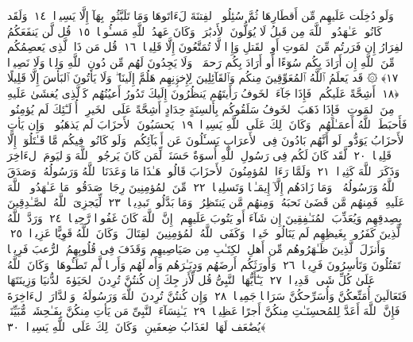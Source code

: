  وَلَو دُخِلَت عَلَيهِم مِّن أَقطَارِهَا ثُمَّ سُئِلُوا۟ ٱلفِتنَةَ لَءَاتَوهَا وَمَا تَلَبَّثُوا۟ بِهَآ إِلَّا يَسِيرًۭا ﴿١٤﴾
 وَلَقَد كَانُوا۟ عَـٰهَدُوا۟ ٱللَّهَ مِن قَبلُ لَا يُوَلُّونَ ٱلأَدبَٰرَ ۚ وَكَانَ عَهدُ ٱللَّهِ مَسـُٔولًۭا ﴿١٥﴾
 قُل لَّن يَنفَعَكُمُ ٱلفِرَارُ إِن فَرَرتُم مِّنَ ٱلمَوتِ أَوِ ٱلقَتلِ وَإِذًۭا لَّا تُمَتَّعُونَ إِلَّا قَلِيلًۭا ﴿١٦﴾
 قُل مَن ذَا ٱلَّذِى يَعصِمُكُم مِّنَ ٱللَّهِ إِن أَرَادَ بِكُم سُوٓءًا أَو أَرَادَ بِكُم رَحمَةًۭ ۚ وَلَا يَجِدُونَ لَهُم مِّن دُونِ ٱللَّهِ وَلِيًّۭا وَلَا نَصِيرًۭا ﴿١٧﴾
 ۞ قَد يَعلَمُ ٱللَّهُ ٱلمُعَوِّقِينَ مِنكُم وَٱلقَآئِلِينَ لِإِخوَٟنِهِم هَلُمَّ إِلَينَا ۖ وَلَا يَأتُونَ ٱلبَأسَ إِلَّا قَلِيلًا ﴿١٨﴾
 أَشِحَّةً عَلَيكُم ۖ فَإِذَا جَآءَ ٱلخَوفُ رَأَيتَهُم يَنظُرُونَ إِلَيكَ تَدُورُ أَعيُنُهُم كَٱلَّذِى يُغشَىٰ عَلَيهِ مِنَ ٱلمَوتِ ۖ فَإِذَا ذَهَبَ ٱلخَوفُ سَلَقُوكُم بِأَلسِنَةٍ حِدَادٍ أَشِحَّةً عَلَى ٱلخَيرِ ۚ أُو۟لَـٰٓئِكَ لَم يُؤمِنُوا۟ فَأَحبَطَ ٱللَّهُ أَعمَـٰلَهُم ۚ وَكَانَ ذَٟلِكَ عَلَى ٱللَّهِ يَسِيرًۭا ﴿١٩﴾
 يَحسَبُونَ ٱلأَحزَابَ لَم يَذهَبُوا۟ ۖ وَإِن يَأتِ ٱلأَحزَابُ يَوَدُّوا۟ لَو أَنَّهُم بَادُونَ فِى ٱلأَعرَابِ يَسـَٔلُونَ عَن أَنۢبَآئِكُم ۖ وَلَو كَانُوا۟ فِيكُم مَّا قَـٰتَلُوٓا۟ إِلَّا قَلِيلًۭا ﴿٢٠﴾
 لَّقَد كَانَ لَكُم فِى رَسُولِ ٱللَّهِ أُسوَةٌ حَسَنَةٌۭ لِّمَن كَانَ يَرجُوا۟ ٱللَّهَ وَٱليَومَ ٱلءَاخِرَ وَذَكَرَ ٱللَّهَ كَثِيرًۭا ﴿٢١﴾
 وَلَمَّا رَءَا ٱلمُؤمِنُونَ ٱلأَحزَابَ قَالُوا۟ هَـٰذَا مَا وَعَدَنَا ٱللَّهُ وَرَسُولُهُۥ وَصَدَقَ ٱللَّهُ وَرَسُولُهُۥ ۚ وَمَا زَادَهُم إِلَّآ إِيمَـٰنًۭا وَتَسلِيمًۭا ﴿٢٢﴾
 مِّنَ ٱلمُؤمِنِينَ رِجَالٌۭ صَدَقُوا۟ مَا عَـٰهَدُوا۟ ٱللَّهَ عَلَيهِ ۖ فَمِنهُم مَّن قَضَىٰ نَحبَهُۥ وَمِنهُم مَّن يَنتَظِرُ ۖ وَمَا بَدَّلُوا۟ تَبدِيلًۭا ﴿٢٣﴾
 لِّيَجزِىَ ٱللَّهُ ٱلصَّـٰدِقِينَ بِصِدقِهِم وَيُعَذِّبَ ٱلمُنَـٰفِقِينَ إِن شَآءَ أَو يَتُوبَ عَلَيهِم ۚ إِنَّ ٱللَّهَ كَانَ غَفُورًۭا رَّحِيمًۭا ﴿٢٤﴾
 وَرَدَّ ٱللَّهُ ٱلَّذِينَ كَفَرُوا۟ بِغَيظِهِم لَم يَنَالُوا۟ خَيرًۭا ۚ وَكَفَى ٱللَّهُ ٱلمُؤمِنِينَ ٱلقِتَالَ ۚ وَكَانَ ٱللَّهُ قَوِيًّا عَزِيزًۭا ﴿٢٥﴾
 وَأَنزَلَ ٱلَّذِينَ ظَـٰهَرُوهُم مِّن أَهلِ ٱلكِتَـٰبِ مِن صَيَاصِيهِم وَقَذَفَ فِى قُلُوبِهِمُ ٱلرُّعبَ فَرِيقًۭا تَقتُلُونَ وَتَأسِرُونَ فَرِيقًۭا ﴿٢٦﴾
 وَأَورَثَكُم أَرضَهُم وَدِيَـٰرَهُم وَأَموَٟلَهُم وَأَرضًۭا لَّم تَطَـُٔوهَا ۚ وَكَانَ ٱللَّهُ عَلَىٰ كُلِّ شَىءٍۢ قَدِيرًۭا ﴿٢٧﴾
 يَـٰٓأَيُّهَا ٱلنَّبِىُّ قُل لِّأَزوَٟجِكَ إِن كُنتُنَّ تُرِدنَ ٱلحَيَوٰةَ ٱلدُّنيَا وَزِينَتَهَا فَتَعَالَينَ أُمَتِّعكُنَّ وَأُسَرِّحكُنَّ سَرَاحًۭا جَمِيلًۭا ﴿٢٨﴾
 وَإِن كُنتُنَّ تُرِدنَ ٱللَّهَ وَرَسُولَهُۥ وَٱلدَّارَ ٱلءَاخِرَةَ فَإِنَّ ٱللَّهَ أَعَدَّ لِلمُحسِنَـٰتِ مِنكُنَّ أَجرًا عَظِيمًۭا ﴿٢٩﴾
 يَـٰنِسَآءَ ٱلنَّبِىِّ مَن يَأتِ مِنكُنَّ بِفَـٰحِشَةٍۢ مُّبَيِّنَةٍۢ يُضَٰعَف لَهَا ٱلعَذَابُ ضِعفَينِ ۚ وَكَانَ ذَٟلِكَ عَلَى ٱللَّهِ يَسِيرًۭا ﴿٣٠﴾

